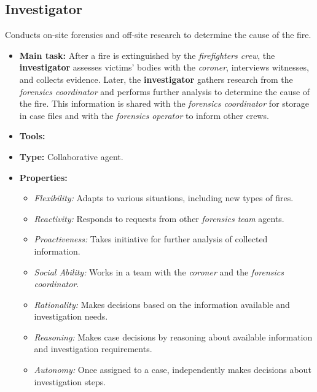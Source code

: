 \documentclass{article}
\begin{document}
\subsection*{Investigator}
Conducts on-site forensics and off-site research to determine the cause of the fire.
\begin{itemize}
    \item \textbf{Main task:} After a fire is extinguished by the \textit{firefighters crew}, the \textbf{investigator} assesses victims' bodies with the \textit{coroner}, interviews witnesses, and collects evidence. Later, the \textbf{investigator} gathers research from the \textit{forensics coordinator} and performs further analysis to determine the cause of the fire. This information is shared with the \textit{forensics coordinator} for storage in case files and with the \textit{forensics operator} to inform other crews.
    \item \textbf{Tools:}
    \item \textbf{Type:} Collaborative agent.
    \item \textbf{Properties:}
    \begin{itemize}
        \item \textit{Flexibility:} Adapts to various situations, including new types of fires.
        \item \textit{Reactivity:} Responds to requests from other \textit{forensics team} agents.
        \item \textit{Proactiveness:} Takes initiative for further analysis of collected information.
        \item \textit{Social Ability:} Works in a team with the \textit{coroner} and the \textit{forensics coordinator}.
        \item \textit{Rationality:} Makes decisions based on the information available and investigation needs.
        \item \textit{Reasoning:} Makes case decisions by reasoning about available information and investigation requirements.
        \item \textit{Autonomy:} Once assigned to a case, independently makes decisions about investigation steps.
    \end{itemize}
\end{itemize}
\end{document}
